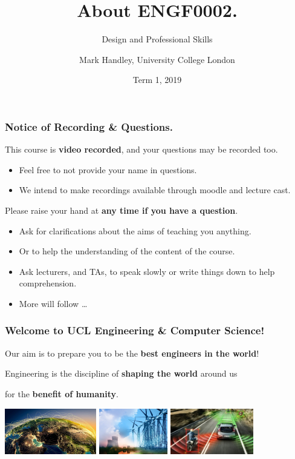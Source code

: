\documentclass{beamer} %
\author{Mark Handley, University College London}
\title{About ENGF0002.}
\subtitle{Design and Professional Skills }
\date{Term 1, 2019}
\newcommand\emc[1]{\textcolor{midred}{\textbf{#1}}}
\begin{document}
\nobibliography*


\frame{
\titlepage
}

\begin{frame}
\frametitle{Notice of Recording \& Questions.}

This course is \emc{video recorded}, and your questions may be recorded too. 
\begin{itemize}
    \item Feel free to not provide your name in questions.
    \item We intend to make recordings available through moodle and lecture cast.
\end{itemize}

\vspace{3mm}
Please raise your hand at \emc{any time if you have a question}.
\begin{itemize}
    \item Ask for clarifications about the aims of teaching you anything.
    \item Or to help the understanding of the content of the course.
    \item Ask lecturers, and TAs, to speak slowly or write things down to help comprehension.
    \item More will follow \ldots
\end{itemize}

\end{frame} 


\begin{frame}
\frametitle{Welcome to UCL Engineering \& Computer Science!}

Our aim is to prepare you to be the \emc{best engineers in the world}!

\vspace{10mm}
Engineering is the discipline of \emc{shaping the world} around us 

for the \emc{benefit of humanity}.

\vspace{5mm}
\centering
\includegraphics[height=20mm]{img/internet.jpg} \quad
\includegraphics[height=20mm]{img/power.jpg} \quad
\includegraphics[height=20mm]{img/cars.jpg}

\end{frame}
\end{document}
